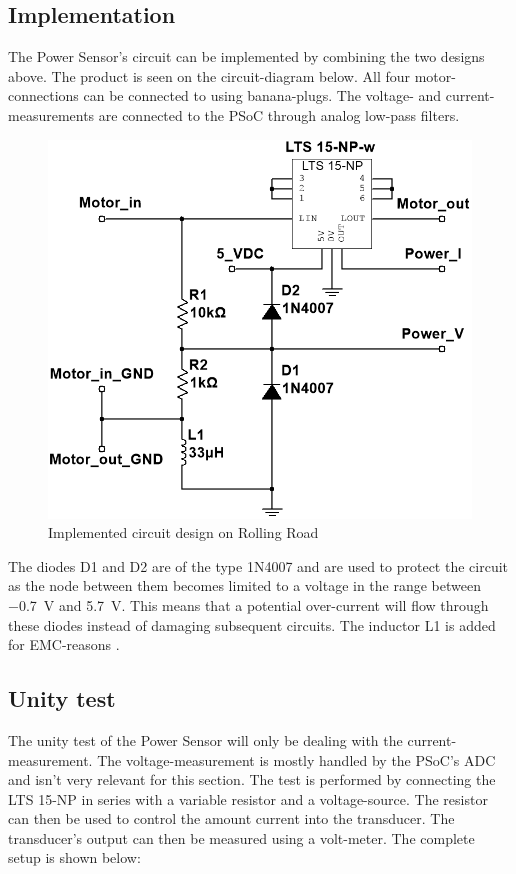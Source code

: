 \subsection{Implementation}
The Power Sensor's circuit can be implemented by combining the two designs above. The product is seen on the circuit-diagram below. All four motor-connections can be connected to using banana-plugs. The voltage- and current-measurements are connected to the PSoC through analog low-pass filters.

\begin{figure}[H]
	\centering
	\includegraphics[width=0.7\linewidth]{Hardware/Pictures/PowerSensor_circuit}
	\caption{Implemented circuit design on Rolling Road}
	\label{fig:PowerSensor_circuit}
\end{figure}

The diodes D1 and D2 are of the type 1N4007 and are used to protect the circuit as the node between them becomes limited to a voltage in the range between \SI{-0.7}{\volt} and \SI{5.7}{\volt}. This means that a potential over-current will flow through these diodes instead of damaging subsequent circuits. The inductor L1 is added for EMC-reasons .

\subsection{Unity test}
The unity test of the Power Sensor will only be dealing with the current-measurement. The voltage-measurement is mostly handled by the PSoC's ADC and isn't very relevant for this section. The test is performed by connecting the LTS 15-NP in series with a variable resistor and a voltage-source. The resistor can then be used to control the amount current into the transducer. The transducer's output can then be measured using a volt-meter. The complete setup is shown below:

